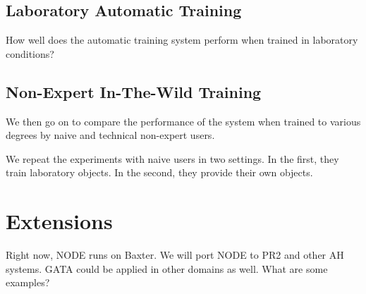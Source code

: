 \documentclass[conference]{IEEEtran}
\begin{document}
\subsection{Laboratory Automatic Training}
How well does the automatic training system perform when trained in laboratory conditions?

\subsection{Non-Expert In-The-Wild Training}
We then go on to compare the performance of the system when trained to various degrees by naive
and technical non-expert users.

We repeat the experiments with naive users in two settings. In the first, they train laboratory
objects. In the second, they provide their own objects.


\citep{tellex11}


\section{Extensions}
Right now, NODE runs on Baxter. We will port NODE to PR2 and other AH systems.
GATA could be applied in other domains as well.  What are some examples?





\end{document}
